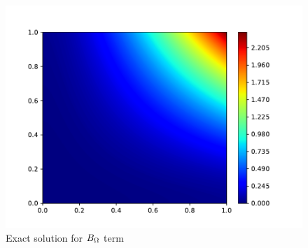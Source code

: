 \begin{figure}[H]
    \includegraphics[height=0.35\textheight]{media/enstrophy-transport-terms/C-term-exact.pdf}
    \caption{Exact solution for $B_{\Omega}$ term}
    \label{fig:b-exact}
\end{figure}

